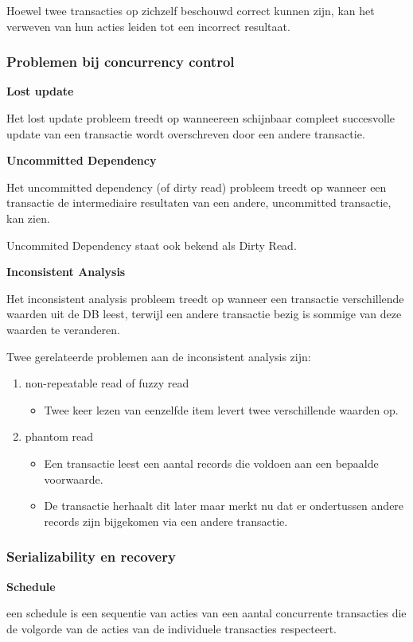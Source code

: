 \documentclass[a4paper,12pt]{article}
\begin{document}
Hoewel twee transacties op zichzelf beschouwd correct kunnen zijn, kan het verweven van hun acties leiden tot een incorrect resultaat.

\subsubsection{Problemen bij concurrency control}
\textbf{Lost update}

Het lost update probleem treedt op wanneereen schijnbaar compleet succesvolle update van een transactie wordt overschreven door een andere transactie.

\textbf{Uncommitted Dependency}

Het uncommitted dependency (of dirty read) probleem treedt op wanneer een transactie de intermediaire resultaten van een andere, uncommitted transactie, kan zien.

Uncommited Dependency staat ook bekend als Dirty Read.

\textbf{Inconsistent Analysis}

Het inconsistent analysis probleem treedt op wanneer een transactie verschillende waarden uit de DB leest, terwijl een andere transactie bezig is sommige van deze waarden te veranderen.

Twee gerelateerde problemen aan de inconsistent analysis zijn:
\begin{enumerate}
\item non-repeatable read of fuzzy read
	\begin{itemize}
	\item Twee keer lezen van eenzelfde item levert twee verschillende waarden op.
	\end{itemize}
\item phantom read
	\begin{itemize}
	\item Een transactie leest een aantal records die voldoen aan een bepaalde voorwaarde.
	\item De transactie herhaalt dit later maar merkt nu dat er ondertussen andere records zijn bijgekomen via een andere transactie.
	\end{itemize}
\end{enumerate}

\subsubsection{Serializability en recovery}
\textbf{Schedule}

een schedule is een sequentie van acties van een aantal concurrente transacties die de volgorde van de acties van de individuele transacties respecteert.
\end{document}
